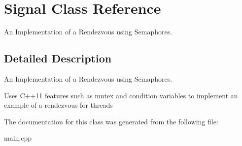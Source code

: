 \hypertarget{class_signal}{}\section{Signal Class Reference}
\label{class_signal}


An Implementation of a Rendezvous using Semaphores.  




\subsection{Detailed Description}
An Implementation of a Rendezvous using Semaphores. 

Uses C++11 features such as mutex and condition variables to implement an example of a rendezvous for threads 

The documentation for this class was generated from the following file\+:\begin{DoxyCompactItemize}
\item 
main.\+cpp\end{DoxyCompactItemize}
